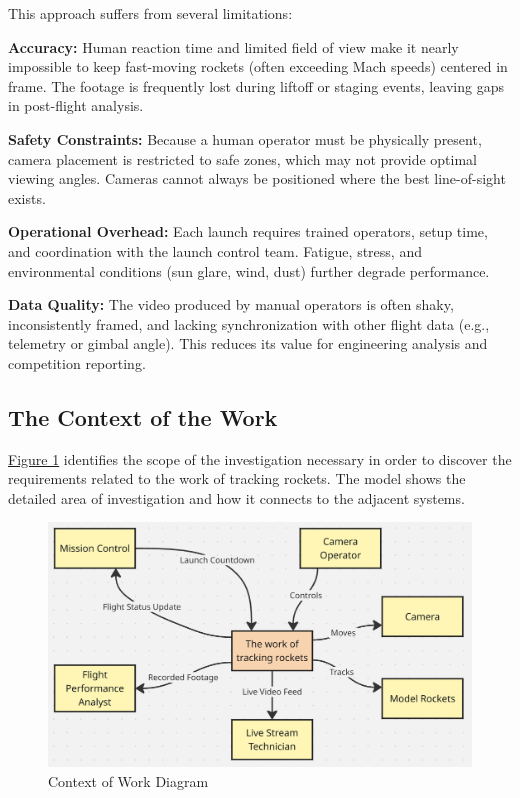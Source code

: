 \documentclass[12pt]{article}
\begin{document}
This approach suffers from several limitations:

\textbf{Accuracy:} Human reaction time and limited field of view make it nearly
impossible to keep fast-moving rockets (often exceeding Mach speeds) centered
in frame. The footage is frequently lost during liftoff or staging events,
leaving gaps in post-flight analysis.

\textbf{Safety Constraints:} Because a human operator must be physically present, camera
placement is restricted to safe zones, which may not provide optimal viewing
angles. Cameras cannot always be positioned where the best line-of-sight
exists.

\textbf{Operational Overhead:} Each launch requires trained operators, setup time, and
coordination with the launch control team. Fatigue, stress, and environmental
conditions (sun glare, wind, dust) further degrade performance.

\textbf{Data Quality:} The video produced by manual operators is often shaky,
inconsistently framed, and lacking synchronization with other flight data
(e.g., telemetry or gimbal angle). This reduces its value for engineering
analysis and competition reporting.

\subsection{The Context of the Work}

\hyperref[img:context-of-work]{Figure 1} identifies the scope of the
investigation necessary in order to discover the requirements related to the
work of tracking rockets. The model shows the detailed area of investigation
and how it connects to the adjacent systems.

\FloatBarrier
\begin{figure}[h]
  \centering
  \includegraphics[width=\textwidth,height=\textheight,keepaspectratio]{../Images/context_of_work.png}
  \caption{Context of Work Diagram}
  \label{img:context-of-work}
\end{figure}
\FloatBarrier
\end{document}
